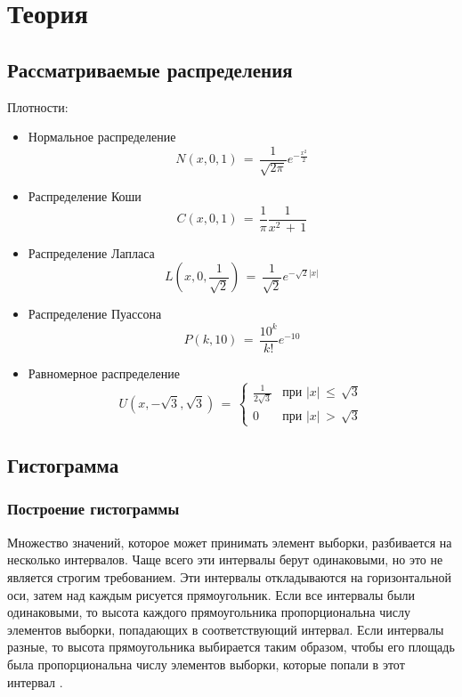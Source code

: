 \newpage
\section{Теория}
\subsection{ Рассматриваемые распределения}
\begin{flushleft}
	Плотности:
	\begin{itemize}
		\item Нормальное распределение
		\begin{equation}
			\label{3} N(x, 0, 1)\,=\,\frac{1}{\sqrt{2\pi}}e^{-\frac{x^2}{2}}
		\end{equation}
		\item Распределение Коши
		\begin{equation}
			\label{4} C(x, 0, 1)\,=\,\frac{1}{\pi}\frac{1}{x^2\,+\,1}
		\end{equation}
		\item Распределение Лапласа
		\begin{equation}
			\label{5} L(x, 0, \frac{1}{\sqrt{2}})\,=\,\frac{1}{\sqrt{2}}e^{-\sqrt{2}\left|x\right|}
		\end{equation}
		\item Распределение Пуассона
		\begin{equation}
			\label{6} P(k, 10)\,=\,\frac{10^k}{k!}e^{-10}
		\end{equation}
		\item Равномерное распределение
		\begin{equation}
			\label{7} U(x, -\sqrt{3}, \sqrt{3})\,=\,
			\begin{cases}
				\frac{1}{2\sqrt{3}} &\text{при $\left|x\right|\,\leq\,\sqrt{3}$}\\
				0 &\text{при $\left|x\right|\,>\,\sqrt{3}$}
			\end{cases}
		\end{equation}
	\end{itemize}
\end{flushleft}

\subsection{Гистограмма}
\subsubsection{Построение гистограммы}
\begin{flushleft}
Множество значений, которое может принимать элемент выборки, разбивается на несколько интервалов. Чаще всего эти интервалы берут одинаковыми, но это не является строгим требованием. Эти интервалы откладываются на горизонтальной оси, затем над каждым рисуется прямоугольник. Если все интервалы были одинаковыми, то высота каждого прямоугольника пропорциональна числу элементов выборки, попадающих в соответствующий интервал. Если интервалы разные, то высота прямоугольника выбирается таким образом, чтобы его площадь была пропорциональна числу элементов выборки, которые попали в этот интервал \cite{1}.
\end{flushleft}

